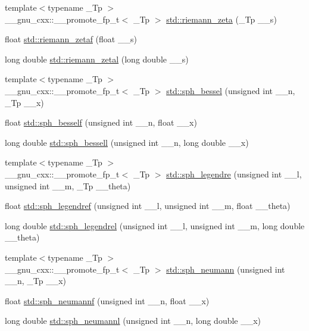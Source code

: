 \begin{DoxyCompactItemize}
\item 
{\footnotesize template$<$typename \+\_\+\+Tp $>$ }\\\+\_\+\+\_\+gnu\+\_\+cxx\+::\+\_\+\+\_\+promote\+\_\+fp\+\_\+t$<$ \+\_\+\+Tp $>$ \hyperlink{group__tr29124__math__spec__func_ga57bb10396587a75e909d3c6e47dadf20}{std\+::riemann\+\_\+zeta} (\+\_\+\+Tp \+\_\+\+\_\+s)
\item 
float \hyperlink{group__tr29124__math__spec__func_gaf92063315061a56d3e2c4053156d968e}{std\+::riemann\+\_\+zetaf} (float \+\_\+\+\_\+s)
\item 
long double \hyperlink{group__tr29124__math__spec__func_ga1e92da3b878d75270f38d3ec9b513086}{std\+::riemann\+\_\+zetal} (long double \+\_\+\+\_\+s)
\item 
{\footnotesize template$<$typename \+\_\+\+Tp $>$ }\\\+\_\+\+\_\+gnu\+\_\+cxx\+::\+\_\+\+\_\+promote\+\_\+fp\+\_\+t$<$ \+\_\+\+Tp $>$ \hyperlink{group__tr29124__math__spec__func_ga52331d03089052b53d96c776c62e4997}{std\+::sph\+\_\+bessel} (unsigned int \+\_\+\+\_\+n, \+\_\+\+Tp \+\_\+\+\_\+x)
\item 
float \hyperlink{group__tr29124__math__spec__func_ga534e36e1dcefad8daec98920db16eec4}{std\+::sph\+\_\+besself} (unsigned int \+\_\+\+\_\+n, float \+\_\+\+\_\+x)
\item 
long double \hyperlink{group__tr29124__math__spec__func_ga11d72b1af81ce9da3c878a25087ee927}{std\+::sph\+\_\+bessell} (unsigned int \+\_\+\+\_\+n, long double \+\_\+\+\_\+x)
\item 
{\footnotesize template$<$typename \+\_\+\+Tp $>$ }\\\+\_\+\+\_\+gnu\+\_\+cxx\+::\+\_\+\+\_\+promote\+\_\+fp\+\_\+t$<$ \+\_\+\+Tp $>$ \hyperlink{group__tr29124__math__spec__func_ga5b33a8e403bfa3c6df370e163310d66c}{std\+::sph\+\_\+legendre} (unsigned int \+\_\+\+\_\+l, unsigned int \+\_\+\+\_\+m, \+\_\+\+Tp \+\_\+\+\_\+theta)
\item 
float \hyperlink{group__tr29124__math__spec__func_gaae635d28c06a3be2679901b382090852}{std\+::sph\+\_\+legendref} (unsigned int \+\_\+\+\_\+l, unsigned int \+\_\+\+\_\+m, float \+\_\+\+\_\+theta)
\item 
long double \hyperlink{group__tr29124__math__spec__func_ga2f6618dea1847f09fd67f3c974c1910d}{std\+::sph\+\_\+legendrel} (unsigned int \+\_\+\+\_\+l, unsigned int \+\_\+\+\_\+m, long double \+\_\+\+\_\+theta)
\item 
{\footnotesize template$<$typename \+\_\+\+Tp $>$ }\\\+\_\+\+\_\+gnu\+\_\+cxx\+::\+\_\+\+\_\+promote\+\_\+fp\+\_\+t$<$ \+\_\+\+Tp $>$ \hyperlink{group__tr29124__math__spec__func_gae8528a53bb38d600c6c517a7ec10039e}{std\+::sph\+\_\+neumann} (unsigned int \+\_\+\+\_\+n, \+\_\+\+Tp \+\_\+\+\_\+x)
\item 
float \hyperlink{group__tr29124__math__spec__func_ga789143122fa99536329bc2d1b1aac2f0}{std\+::sph\+\_\+neumannf} (unsigned int \+\_\+\+\_\+n, float \+\_\+\+\_\+x)
\item 
long double \hyperlink{group__tr29124__math__spec__func_ga3cededa9b6e4601f190c3811e6aabfd6}{std\+::sph\+\_\+neumannl} (unsigned int \+\_\+\+\_\+n, long double \+\_\+\+\_\+x)
\end{DoxyCompactItemize}


